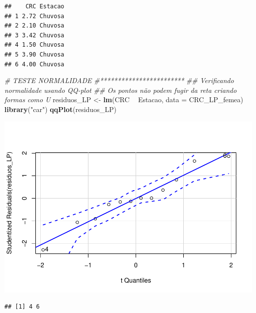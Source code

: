 \documentclass[
]{book}
\newenvironment{Shaded}{\begin{snugshade}}{\end{snugshade}}
\newcommand{\CommentTok}[1]{\textcolor[rgb]{0.56,0.35,0.01}{\textit{#1}}}
\newcommand{\DataTypeTok}[1]{\textcolor[rgb]{0.13,0.29,0.53}{#1}}
\newcommand{\KeywordTok}[1]{\textcolor[rgb]{0.13,0.29,0.53}{\textbf{#1}}}
\newcommand{\NormalTok}[1]{#1}
\newcommand{\OperatorTok}[1]{\textcolor[rgb]{0.81,0.36,0.00}{\textbf{#1}}}
\newcommand{\StringTok}[1]{\textcolor[rgb]{0.31,0.60,0.02}{#1}}
\begin{document}
\begin{verbatim}
##    CRC Estacao
## 1 2.72 Chuvosa
## 2 2.10 Chuvosa
## 3 3.42 Chuvosa
## 4 1.50 Chuvosa
## 5 3.90 Chuvosa
## 6 4.00 Chuvosa
\end{verbatim}

\begin{Shaded}
\begin{Highlighting}[]
\CommentTok{# TESTE NORMALIDADE}
\CommentTok{#************************}
\CommentTok{## Verificando normalidade usando QQ-plot}
\CommentTok{## Os pontos não podem fugir da reta criando formas como U}
\NormalTok{residuos_LP <-}\StringTok{ }\KeywordTok{lm}\NormalTok{(CRC }\OperatorTok{~}\StringTok{ }\NormalTok{Estacao, }\DataTypeTok{data =}\NormalTok{ CRC_LP_femea)}
\KeywordTok{library}\NormalTok{(}\StringTok{"car"}\NormalTok{)}
\KeywordTok{qqPlot}\NormalTok{(residuos_LP)}
\end{Highlighting}
\end{Shaded}

\includegraphics{livro_r_ecologia_files/figure-latex/unnamed-chunk-3-1.pdf}

\begin{verbatim}
## [1] 4 6
\end{verbatim}

\begin{Shaded}
\end{Shaded}
\end{document}
